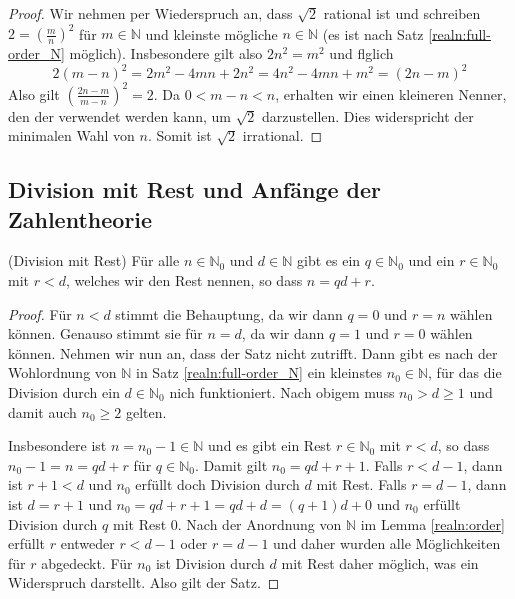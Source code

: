 \documentclass[../Analysis1_script.tex]{subfiles}
\begin{document}
\begin{proof}
	Wir nehmen per Wiederspruch an, dass $\sqrt{2}$ rational ist und schreiben $2 = (\frac{m}{n})^2$ für $m \in \mathbb{N}$ und kleinste mögliche $n \in \mathbb{N}$ (es ist nach Satz \ref{realn:full-order_N} möglich). Insbesondere gilt also $2n^2 = m^2$ und flglich
	\begin{equation}
		2(m-n)^2 = 2m^2 - 4mn + 2n^2 = 4n^2 - 4mn + m^2 = (2n - m)^2
	\end{equation}
	Also gilt $\left(\frac{2n - m}{m - n}\right)^2 = 2$. Da $0 < m - n < n$, erhalten wir einen kleineren Nenner, den der verwendet werden kann, um $\sqrt{2}$ darzustellen. Dies widerspricht der minimalen Wahl von $n$. Somit ist $\sqrt{2}$ irrational.
\end{proof}

\subsection{Division mit Rest und Anfänge der Zahlentheorie}

\begin{proposition}{(Division mit Rest)}
	Für alle $n \in \mathbb{N}_0$ und $d \in \mathbb{N}$ gibt es ein $q \in \mathbb{N}_0$ und ein $r \in \mathbb{N}_0$ mit $r < d$, welches wir den Rest nennen, so dass $n = qd + r$.
\end{proposition} 

\begin{proof}
	Für $n < d$ stimmt die Behauptung, da wir dann $q = 0$ und $r = n$ wählen können. Genauso stimmt sie für $n = d$, da wir dann $q = 1$ und $r = 0$ wählen können. Nehmen wir nun an, dass der Satz nicht zutrifft. Dann gibt es nach der Wohlordnung von $\mathbb{N}$ in Satz \ref{realn:full-order_N} ein kleinstes $n_0 \in \mathbb{N}$, für das die Division durch ein $d \in \mathbb{N}_0$ nich funktioniert. Nach obigem muss $n_0 > d \geq 1$ und damit auch $n_0 \geq 2$ gelten.
	
	Insbesondere ist $n = n_0 - 1 \in \mathbb{N}$ und es gibt ein Rest $r \in \mathbb{N}_0$ mit $r < d$, so dass $n_0-1 = n = qd + r$ für $q \in \mathbb{N}_0$. Damit gilt $n_0 = qd + r + 1$. Falls $r < d - 1$, dann ist $r + 1 < d$ und $n_0$ erfüllt doch Division durch $d$ mit Rest. Falls $r = d - 1$, dann ist $d = r + 1$ und $n_0 = qd + r + 1 = qd + d = (q + 1)d + 0$ und $n_0$ erfüllt Division durch $q$ mit Rest $0$. Nach der Anordnung von $\mathbb{N}$ im Lemma \ref{realn:order} erfüllt $r$ entweder $r < d - 1$ oder $r = d - 1$ und daher wurden alle Möglichkeiten für $r$ abgedeckt. Für $n_0$ ist Division durch $d$ mit Rest daher möglich, was ein Widerspruch darstellt. Also gilt der Satz.
\end{proof}
\end{document}
